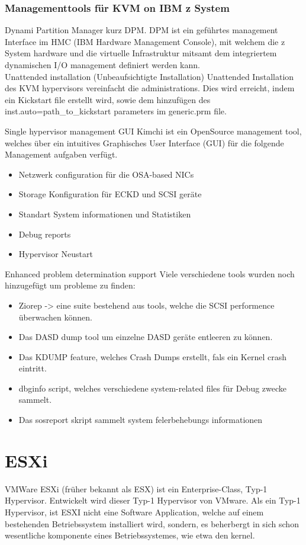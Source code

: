 \documentclass[14pt]{extreport}
\begin{document}
\subsubsection{Managementtools für KVM on IBM z System}
Dynami Partition Manager kurz DPM.
DPM ist ein geführtes management Interface im HMC (IBM Hardware Management Console), mit welchem die z System hardware und die virtuelle Infrastruktur mitsamt dem integriertem dynamischen I/O management  definiert werden kann.\\
Unattended installation (Unbeaufsichtigte Installation)
Unattended Installation des KVM hypervisors vereinfacht die administrations. Dies wird erreicht, indem ein Kickstart file erstellt wird, sowie dem hinzufügen des inst.auto=path\_to\_kickstart  parameters im generic.prm file.

Single hypervisor management GUI
Kimchi ist ein OpenSource management tool, welches über ein intuitives Graphisches User Interface (GUI) für die folgende Management aufgaben verfügt.
\begin{itemize}
    \item Netzwerk configuration für die OSA-based NICs
    \item Storage Konfiguration für ECKD und SCSI geräte
    \item Standart System informationen und Statistiken
    \item Debug reports
    \item Hypervisor Neustart
\end{itemize}
Enhanced problem determination support
Viele verschiedene tools wurden noch hinzugefügt um probleme zu finden:
\begin{itemize}
    \item Ziorep -> eine suite bestehend aus tools, welche die SCSI performence überwachen können.
    \item Das DASD dump tool um einzelne DASD geräte entleeren zu können.
    \item Das KDUMP feature, welches Crash Dumps erstellt, fals ein Kernel crash eintritt.
    \item dbginfo script, welches verschiedene system-related files für Debug zwecke sammelt.
    \item Das sosreport skript sammelt system felerbehebungs informationen
\end{itemize}

\section{ESXi}
VMWare ESXi (früher bekannt als ESX) ist ein Enterprise-Class, Typ-1 Hypervisor. Entwickelt wird dieser Typ-1 Hypervisor von VMware. Als ein Typ-1 Hypervisor, ist ESXI nicht eine Software Application, welche auf einem bestehenden Betriebssystem installiert wird, sondern, es beherbergt in sich schon wesentliche komponente eines Betriebssystemes, wie etwa den kernel.
\end{document}
